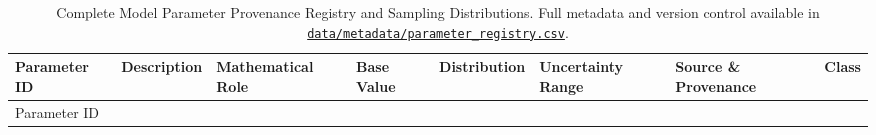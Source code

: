\documentclass[
  11pt,
  a4paper]{article}
\begin{document}
\begin{longtable}[]{@{}
  >{\raggedright\arraybackslash}p{}
  >{\raggedright\arraybackslash}p{}
  >{\raggedright\arraybackslash}p{}
  >{\centering\arraybackslash}p{}
  >{\raggedright\arraybackslash}p{}
  >{\centering\arraybackslash}p{}
  >{\raggedright\arraybackslash}p{}
  >{\centering\arraybackslash}p{}@{}}
\caption{Complete Model Parameter Provenance Registry and Sampling
Distributions. Full metadata and version control available in
\href{file:///c:/Users/drfir/Documents/physician-exodus-tunisia/data/metadata/parameter_registry.csv}{\protect\texttt{data/metadata/parameter\_registry.csv}}.}\label{tbl-app-params}\tabularnewline
\toprule\noalign{}
\begin{minipage}[b]{\linewidth}\raggedright
Parameter ID
\end{minipage} & \begin{minipage}[b]{\linewidth}\raggedright
Description
\end{minipage} & \begin{minipage}[b]{\linewidth}\raggedright
Mathematical Role
\end{minipage} & \begin{minipage}[b]{\linewidth}\centering
Base Value
\end{minipage} & \begin{minipage}[b]{\linewidth}\raggedright
Distribution
\end{minipage} & \begin{minipage}[b]{\linewidth}\centering
Uncertainty Range
\end{minipage} & \begin{minipage}[b]{\linewidth}\raggedright
Source \& Provenance
\end{minipage} & \begin{minipage}[b]{\linewidth}\centering
Class
\end{minipage} \\
\midrule\noalign{}
\endfirsthead
\toprule\noalign{}
\begin{minipage}[b]{\linewidth}\raggedright
Parameter ID
\end{minipage} & \begin{minipage}[b]{\linewidth}\raggedright

\end{minipage}
\end{longtable}
\end{document}
